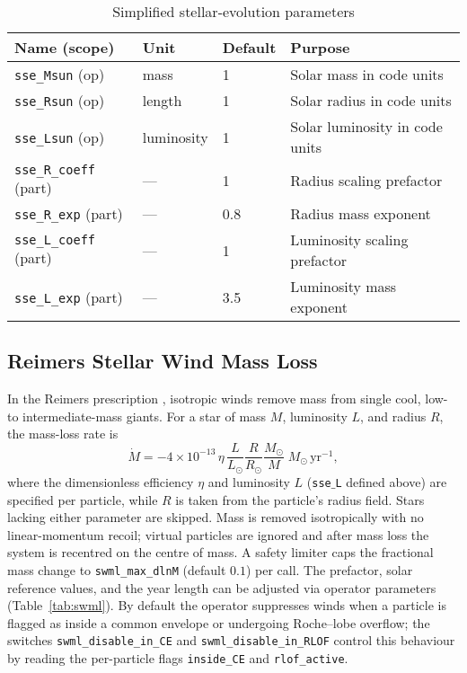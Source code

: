 \documentclass[11pt]{article}
\begin{document}
\begin{table}[h]
\centering\footnotesize
\caption{Simplified stellar-evolution parameters}
\label{tab:sse}
\begin{tabular}{@{}llll@{}}
\toprule
Name (scope) & Unit & Default & Purpose \\
\midrule
\texttt{sse\_Msun}   (op) & mass      & 1   & Solar mass in code units\\
\texttt{sse\_Rsun}   (op) & length     & 1   & Solar radius in code units\\
\texttt{sse\_Lsun}   (op) & luminosity & 1   & Solar luminosity in code units\\
\texttt{sse\_R\_coeff} (part) & —       & 1   & Radius scaling prefactor\\
\texttt{sse\_R\_exp}   (part) & —       & 0.8 & Radius mass exponent\\
\texttt{sse\_L\_coeff} (part) & —       & 1   & Luminosity scaling prefactor\\
\texttt{sse\_L\_exp}   (part) & —       & 3.5 & Luminosity mass exponent\\
\bottomrule
\end{tabular}
\end{table}

\subsection{Reimers Stellar Wind Mass Loss}
\label{sec:swml}
In the Reimers prescription \citep{Reimers1975}, isotropic winds remove mass from single cool, low- to intermediate-mass giants. For a star of mass $M$, luminosity $L$, and radius
$R$, the mass-loss rate is
\[
\dot M = -4\times10^{-13}\,\eta\,\frac{L}{L_\odot}\frac{R}{R_\odot}\frac{M_\odot}{M}
\;M_\odot\,\mathrm{yr}^{-1},
\]
where the dimensionless efficiency $\eta$ and luminosity $L$ (\texttt{sse$\_$L} defined above) are specified per particle, while $R$ is taken from the particle's radius field. Stars lacking either parameter are skipped.
Mass is removed isotropically with no linear-momentum
recoil; virtual particles are ignored and after mass loss the system is
recentred on the centre of mass.  A safety limiter caps the fractional
mass change to \texttt{swml\_max\_dlnM} (default $0.1$) per call.  The
prefactor, solar reference values, and the year length can be adjusted via
operator parameters (Table~\ref{tab:swml}).  By default the operator
suppresses winds when a particle is flagged as inside a common envelope or
undergoing Roche–lobe overflow; the switches
\texttt{swml\_disable\_in\_CE} and \texttt{swml\_disable\_in\_RLOF}
control this behaviour by reading the per-particle flags
\texttt{inside\_CE} and \texttt{rlof\_active}.
\end{document}
